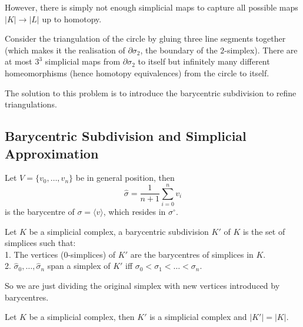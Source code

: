 However, there is simply not enough simplicial maps to capture all possible maps $|K|\to|L|$ up to homotopy.
\begin{example}
    Consider the triangulation of the circle by gluing three line segments together (which makes it the realisation of $\partial\sigma_2$, the boundary of the $2$-simplex).
    There are at most $3^3$ simplicial maps from $\partial\sigma_2$ to itself but infinitely many different homeomorphisms (hence homotopy equivalences) from the circle to itself.
\end{example}
The solution to this problem is to introduce the barycentric subdivision to refine triangulations.
\subsection{Barycentric Subdivision and Simplicial Approximation}
\begin{definition}
    Let $V=\{v_0,\ldots, v_n\}$ be in general position, then
    $$\hat\sigma=\frac{1}{n+1}\sum_{i=0}^nv_i$$
    is the barycentre of $\sigma=\langle v\rangle$, which resides in $\sigma^\circ$.
\end{definition}
\begin{definition}
    Let $K$ be a simplicial complex, a barycentric subdivision $K'$ of $K$ is the set of simplices such that:\\
    1. The vertices ($0$-simplices) of $K'$ are the barycentres of simplices in $K$.\\
    2. $\hat\sigma_0,\ldots,\hat\sigma_n$ span a simplex of $K'$ iff $\sigma_0<\sigma_1<\ldots<\sigma_n$.
\end{definition}
So we are just dividing the original simplex with new vertices introduced by barycentres.
\begin{lemma}
    Let $K$ be a simplicial complex, then $K'$ is a simplicial complex and $|K'|=|K|$.
\end{lemma}
